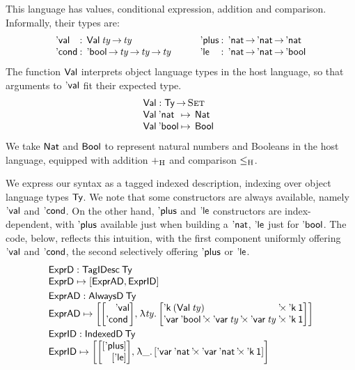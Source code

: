 This language has values, conditional expression, addition and
comparison. Informally, their types are:
%
\[
\begin{array}{l@{\::\:\:}l}
\SYMBEval            & \Val{\V{ty}} \To \V{ty} \\
\SYMBEcond           & \Ebool \To \V{ty} \To \V{ty} \To \V{ty}  \\ 
\end{array}
\qquad
\begin{array}{l@{\::\:\:}l}
\SYMBEplus           & \Enat \To \Enat \To \Enat                           \\
\SYMBEle             & \Enat \To \Enat \To \Ebool                          \\
\end{array}
\]
%
The function $\SYMBVal$ interprets object language types in the
host language, so that arguments to $\SYMBEval$ fit their
expected type.
%
\[\stk{
\SYMBVal : \Ty \To \Set \\
\begin{array}{@{}l@{\:\mapsto\:\:}l}
\Val{\Enat}   & \Nat \\
\Val{\Ebool}  & \Bool
\end{array}
}\]
%
We take $\Nat$ and $\Bool$ to represent natural numbers and Booleans
in the host language, equipped with addition $\plusHost$ and
comparison $\leHost$.

We express our syntax as a tagged indexed description, indexing over
object language types $\Ty$. We note that some constructors are always
available, namely $\SYMBEval$ and $\SYMBEcond$. On the other hand,
$\SYMBEplus$ and $\SYMBEle$ constructors are index-dependent, with
$\SYMBEplus$ available just when building a $\Enat$, $\SYMBEle$ just
for $\Ebool$. The code, below, reflects this intuition, with the first
component uniformly offering $\SYMBEval$ and $\SYMBEcond$, the second
selectively offering $\SYMBEplus$ or $\SYMBEle$.
%
%
\[\stk{
\stk{
\HExprD : \TagIDesc{\Ty} \\
\HExprD \mapsto \sqr{ \HExprAD , \HExprID } \\
} \smallskip\\
\stk{
\HExprAD : \ATagIDesc{\Ty} \\
\HExprAD \mapsto \vtup{l}{
   {\vtup{r}{\SYMBEval\\ \SYMBEcond \,}} \red{,} \;
      \LAM{\V{ty}}
      \vtup{l@{\:}l}{
      \DProd{\DConst{(\Val{\V{ty}})}&}{\DConst{\Unit}} \\
      \DProd{\DProd{\DVar{\Ebool}}{\DProd{\DVar{\V{ty}}}{\DVar{\V{ty}}}}&}
        {\DConst{\Unit}} \\
     }
   }
\smallskip\\
} 
\\
\stk{
\HExprID : \ITagIDesc{\Ty} \\
\HExprID \mapsto \vtup{l}{
                   \vtup{r}{\sqr{\SYMBEplus} \\ \sqr{\SYMBEle}} \red{,} \;
  \LAM{\_} \sqr{\DProd{\DProd{\DVar{\Enat}}{\DVar{\Enat}}}{\DConst{\Unit}}}
                   }
}
}\]

